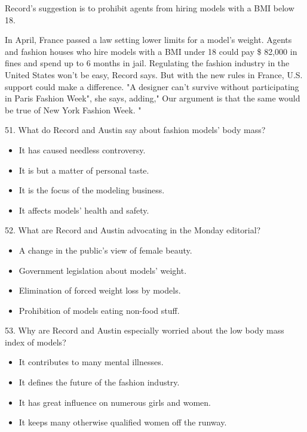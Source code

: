 \documentclass[UTF8,11pt]{ctexart}
\begin{document}
Record's suggestion is to prohibit agents from hiring models with a BMI below 18.


In April, France passed a law setting lower limits for a model's weight. Agents and fashion houses who hire models with a BMI under 18 could pay \$ 82,000 in fines and spend up to 6 months in jail. Regulating the fashion industry in the United States won't be easy, Record says. But with the new rules in France, U.S. support could make a difference. "A designer can't survive without participating in Paris Fashion Week", she says, adding," Our argument is that the same would be true of New York Fashion Week. "


51. What do Record and Austin say about fashion models' body mass?


\begin{itemize}[leftmargin=2em,itemsep=.2em,topsep=.4em]\item[A.] It has caused needless controversy.
\item[B.] It is but a matter of personal taste.
\item[C.] It is the focus of the modeling business.
\item[D.] It affects models' health and safety.
\end{itemize}

52. What are Record and Austin advocating in the Monday editorial?


\begin{itemize}[leftmargin=2em,itemsep=.2em,topsep=.4em]\item[A.] A change in the public's view of female beauty.
\end{itemize}

\begin{itemize}[leftmargin=2em,itemsep=.2em,topsep=.4em]\item[B.] Government legislation about models' weight.
\item[C.] Elimination of forced weight loss by models.
\item[D.] Prohibition of models eating non-food stuff.
\end{itemize}

53. Why are Record and Austin especially worried about the low body mass index of models?


\begin{itemize}[leftmargin=2em,itemsep=.2em,topsep=.4em]\item[A.] It contributes to many mental illnesses.
\item[B.] It defines the future of the fashion industry.
\item[C.] It has great influence on numerous girls and women.
\item[D.] It keeps many otherwise qualified women off the runway.
\end{itemize}
\end{document}
